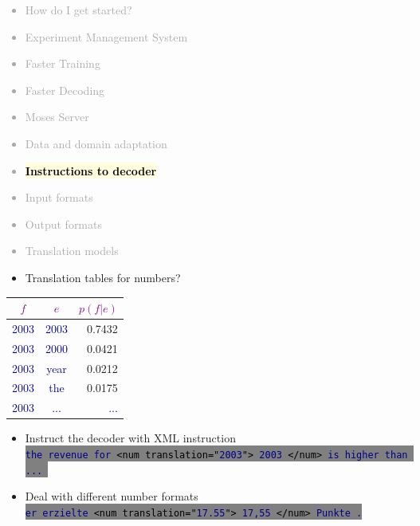 \documentclass[landscape]{uedslides2C}
\newcommand{\example}[1]{\textcolor{darkblue}{\rm #1}}
\newcommand{\maths}[1]{\textcolor{purple}{#1}}
\newcommand{\currenttopic}[1]{\colorbox{lightyellow}{\textcolor{black}{\bf #1}}}
\newcommand{\littlecode}[1]{\colorbox{gray}{\textcolor{black}{\small \tt #1}}}
\begin{document}


\vspace{-5mm}
\textcolor{darkgrey}{
\begin{itemize} \itemsep -1mm
\item {How do I get started?}
\item {Experiment Management System}
\item {Faster Training}
\item {Faster Decoding}
\item {Moses Server}
\item {Data and domain adaptation}
\item \currenttopic{Instructions to decoder}
\item {Input formats}
\item {Output formats}
\item {Translation models}
\end{itemize}
}



\begin{itemize}
\item Translation tables for numbers?
\end{itemize}
\begin{center} \begin{tabular}{c|c|r}
\maths{$f$} & \maths{$e$} & \maths{$p(f|e)$} \\ \hline
\example{2003} & \example{2003} & 0.7432 \\ \hline
\example{2003} & \example{2000} & 0.0421 \\ \hline
\example{2003} & \example{year} & 0.0212 \\ \hline
\example{2003} & \example{the} & 0.0175 \\ \hline
\example{2003} & \example{...} & \example{...} \\ \hline
\end{tabular} \end{center}
\begin{itemize}
\item Instruct the decoder with XML instruction\\[2mm]
\littlecode{\example{the revenue for} <num translation="\example{2003}"> \example{2003}
  </num> \example{is higher than ...} }
\item Deal with different number formats\\[2mm]
\littlecode{\example{er erzielte} <num translation="\example{17.55}"> \example{17,55} </num> \example{Punkte .}}
\end{itemize}
\end{document}
